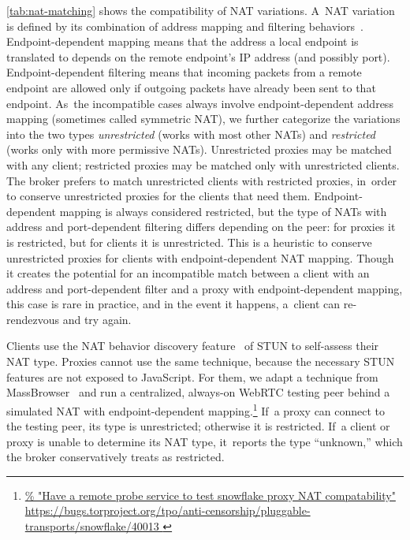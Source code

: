 \documentclass[letterpaper,twocolumn]{article}
\newcommand{\firstterm}[1]{\textit{#1}}
\newlength{\urlfootnotesize}
\newcommand{\urlfootnote}[1]{\footnote{
\raggedright\hangindent\footnotemargin%
\fontsize{\urlfootnotesize}{\urlfootnotesize}\selectfont%
\url{#1}
}}
\begin{document}
\autoref{tab:nat-matching}
shows the compatibility of NAT variations.
A~NAT variation is defined by its combination
of address mapping and filtering behaviors~\cite[\S 3]{rfc5780}.
Endpoint-dependent mapping
means that the address a local endpoint is translated to depends on
the remote endpoint's IP address (and possibly port).
Endpoint-dependent filtering
means that incoming packets from a remote endpoint are
allowed only if outgoing packets have already been sent to that endpoint.
As~the incompatible cases always involve endpoint-dependent address mapping
(sometimes called symmetric NAT),
we further categorize the variations into the two types
\firstterm{unrestricted} (works with most other NATs) and
\firstterm{restricted} (works only with more permissive NATs).
Unrestricted proxies may be matched with any client;
restricted proxies may be matched only with unrestricted clients.
The broker prefers to match unrestricted clients with restricted proxies,
in~order to conserve unrestricted proxies
for the clients that need them.
Endpoint-dependent mapping is always considered restricted,
but the type of NATs with address and port-dependent filtering differs
depending on the peer:
for proxies it is restricted, but
for clients it is unrestricted.
This is a heuristic
to conserve unrestricted proxies
for clients with endpoint-dependent NAT mapping.
Though it creates the potential for an incompatible match
between a client with an address and port-dependent filter and a
proxy with endpoint-dependent mapping,
this case is rare in practice,
and in the event it happens,
a~client can re-rendezvous and try again.

Clients use the NAT behavior discovery feature~\cite{rfc5780} of STUN
to self-assess their NAT type.
Proxies cannot use the same technique,
because the necessary STUN features are not exposed
to JavaScript.
For them,
we adapt a technique from MassBrowser~\cite[\S \mbox{V-A}]{Nasr2020a}
and run a centralized, always-on WebRTC testing peer
behind a simulated NAT with endpoint-dependent mapping.\urlfootnote{
https://bugs.torproject.org/tpo/anti-censorship/pluggable-transports/snowflake/40013
}
If~a proxy can connect to the testing peer,
its type is unrestricted;
otherwise it is restricted.
If~a client or proxy is unable to determine its NAT type,
it~reports the type ``unknown,''
which the broker conservatively treats as restricted.
\end{document}
